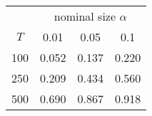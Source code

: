 % 
\begin{tabular}{cccc}
  \hline
  & \multicolumn{3}{c}{nominal size $\alpha$} \\
 $T$ & 0.01 & 0.05 & 0.1 \\
 \hline
100 & 0.052 & 0.137 & 0.220 \\ 
  250 & 0.209 & 0.434 & 0.560 \\ 
  500 & 0.690 & 0.867 & 0.918 \\ 
   \hline
\end{tabular}
